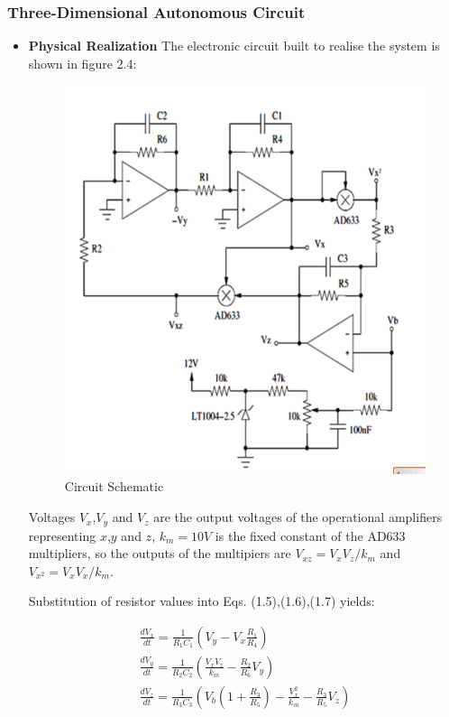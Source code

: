 \subsubsection{Three-Dimensional Autonomous Circuit}
  \begin{itemize}
   \item \textbf{Physical Realization}
    The electronic circuit built to realise the system is shown in figure 2.4:
            \begin{figure}[H]
            \centering
            \includegraphics[scale=0.3]{imagenes/2-benford/Circuit2_schem.png}
            \caption{Circuit Schematic}
            \end{figure}
Voltages $V_x$,$V_y$ and $V_z$ are the output voltages of the operational amplifiers representing $x$,$y$ and $z$, $k_m=10V$ is the fixed constant of the AD633  multipliers, so the outputs of the multipiers are $V_{xz}=V_xV_z/k_m$ and $V_{x^2}=V_xV_x/k_m$.

            Substitution of resistor values into Eqs. (1.5),(1.6),(1.7) yields:

\begin{align}
\frac{dV_x}{dt}=\frac{1}{R_1C_1} \left ( V_y -V_x\frac{R_1}{R_4} \right )\\
\frac{dV_y}{dt}=\frac{1}{R_2C_2} \left ( \frac{V_xV_z}{k_m}-\frac{R_2}{R_6}V_y \right )\\
\frac{dV_z}{dt}=\frac{1}{R_3C_3} \left ( V_b\left ( 1+\frac{R_3}{R_5} \right )  -\frac{V_x^2}{k_m} - \frac{R_3}{R_5}V_z\right )
\end{align}


\end{itemize}
